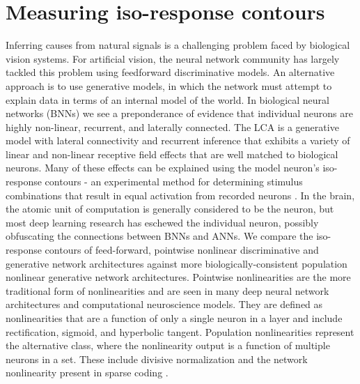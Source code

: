 \section{Measuring iso-response contours}\label{sec:ch4_iso_contours}
Inferring causes from natural signals is a challenging problem faced by biological vision systems.
For artificial vision, the neural network community has largely tackled this problem using feedforward discriminative models.
An alternative approach is to use generative models, in which the network must attempt to explain data in terms of an internal model of the world.
In biological neural networks (BNNs) we see a preponderance of evidence that individual neurons are highly non-linear, recurrent, and laterally connected.
The LCA is a generative model with lateral connectivity and recurrent inference that exhibits a variety of linear \parencite{olshausen1996emergence} and non-linear \parencite{zhu2013visual} receptive field effects that are well matched to biological neurons.
Many of these effects can be explained using the model neuron’s iso-response contours - an experimental method for determining stimulus combinations that result in equal activation from recorded neurons \parencite{golden2016conjectures}.
In the brain, the atomic unit of computation is generally considered to be the neuron, but most deep learning research has eschewed the individual neuron, possibly obfuscating the connections between BNNs and ANNs.
We compare the iso-response contours of feed-forward, pointwise nonlinear discriminative and generative network architectures against more biologically-consistent population nonlinear generative network architectures.
Pointwise nonlinearities are the more traditional form of nonlinearities and are seen in many deep neural network architectures and computational neuroscience models.
They are defined as nonlinearities that are a function of only a single neuron in a layer and include rectification, sigmoid, and hyperbolic tangent.
Population nonlinearities represent the alternative class, where the nonlinearity output is a function of multiple neurons in a set.
These include divisive normalization \parencite{carandini2012normalization, balle2016end} and the network nonlinearity present in sparse coding \parencite{rozell2008sparse, olshausen1997sparse}.

